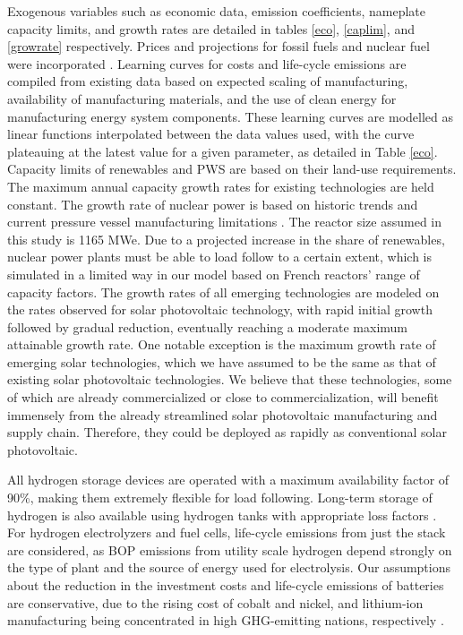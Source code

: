 Exogenous variables such as economic data, emission coefficients, nameplate capacity limits, and growth rates are detailed in tables \ref{eco}, \ref{caplim}, and \ref{growrate} respectively. Prices and projections for fossil fuels and nuclear fuel were incorporated \cite{wittenstein_projected_2015, world_bank_group_commodity_2016, international_energy_agency_world_2019}. Learning curves for costs and life-cycle emissions are compiled from existing data based on expected scaling of manufacturing, availability of manufacturing materials, and the use of clean energy for manufacturing energy system components. These learning curves are modelled as linear functions interpolated between the data values used, with the curve plateauing at the latest value for a given parameter, as detailed in Table \ref{eco}. Capacity limits of renewables and \gls{PWS} are based on their land-use requirements. The maximum annual capacity growth rates for existing technologies are held constant. The growth rate of nuclear power is based on historic trends and current pressure vessel manufacturing limitations \cite{iaea_pris_nodate}. The reactor size assumed in this study is 1165 MWe. Due to a projected increase in the share of renewables, nuclear power plants must be able to load follow to a certain extent, which is simulated in a limited way in our model based on French reactors' range of capacity factors. The growth rates of all emerging technologies are modeled on the rates observed for solar photovoltaic technology, with rapid initial growth followed by gradual reduction, eventually reaching a moderate maximum attainable growth rate. One notable exception is the maximum growth rate of emerging solar technologies, which we have assumed to be the same as that of existing solar photovoltaic technologies. We believe that these technologies, some of which are already commercialized or close to commercialization, will benefit immensely from the already streamlined solar photovoltaic manufacturing and supply chain. Therefore, they could be deployed as rapidly as conventional solar photovoltaic. 

All hydrogen storage devices are operated with a maximum availability factor of 90\%, making them extremely flexible for load following. Long-term storage of hydrogen is also available using hydrogen tanks with appropriate loss factors \cite{iea_technology_2015}. For hydrogen electrolyzers and fuel cells, life-cycle emissions from just the stack are considered, as \gls{BOP} emissions from utility scale hydrogen depend strongly on the type of plant and the source of energy used for electrolysis. Our assumptions about the reduction in the investment costs and life-cycle emissions of batteries are conservative, due to the rising cost of cobalt and nickel, and lithium-ion manufacturing being concentrated in high \gls{GHG}-emitting nations, respectively \cite{oliveira_environmental_2015,emilsson_lithium-ion_2019,turcheniuk_ten_2018,simon_potential_2015}. 

